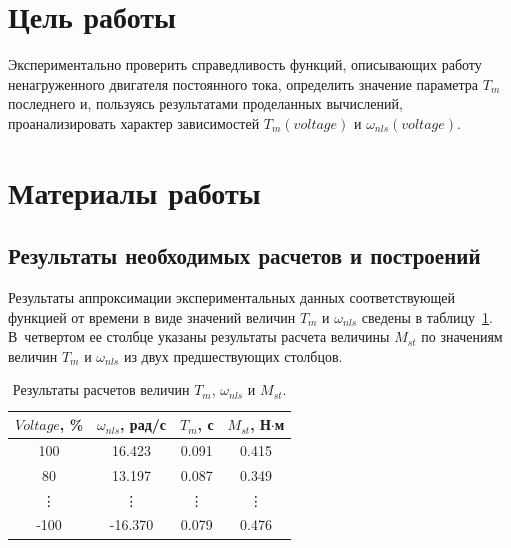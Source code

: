 \documentclass[12pt,titlepage,a4paper]{article}
\begin{document}


\addtocounter{page}{1}

\section{Цель работы}
\hspace{\parindent}Экспериментально проверить справедливость функций, описывающих работу ненагруженного двигателя постоянного тока, определить значение параметра $T_m$ последнего и, пользуясь результатами проделанных вычислений, проанализировать характер зависимостей $T_m(voltage)$ и $\omega_{nls}(voltage)$.

\section{Материалы работы}
\subsection{Результаты необходимых расчетов и построений}
\hspace{\parindent}Результаты аппроксимации экспериментальных данных соответствующей функцией от времени в виде значений величин $T_m$ и $\omega_{nls}$ сведены в таблицу~\ref{table:table_with_results}.
В~четвертом ее столбце указаны результаты расчета величины $M_{st}$ по значениям величин $T_m$ и $\omega_{nls}$  из двух предшествующих столбцов.

\begin{table}[h]
	\caption{Результаты расчетов величин $T_m$, $\omega_{nls}$ и $M_{st}$.}
	\centering\begin{tabular}{|c|c|c|c|}
	\hline
	$Voltage$, \% & $\omega_{nls}$, рад\slash с & $T_m$, с & $M_{st}$, Н$\cdot$м\\
	\hline
	100 & 16.423 & 0.091 & 0.415\\
	\hline
	80  & 13.197 & 0.087 & 0.349\\
	\vdots & \vdots & \vdots & \vdots\\
	-100 & -16.370 & 0.079 & 0.476\\
	\hline
	\end{tabular}
	\label{table:table_with_results}
\end{table}
\end{document}
